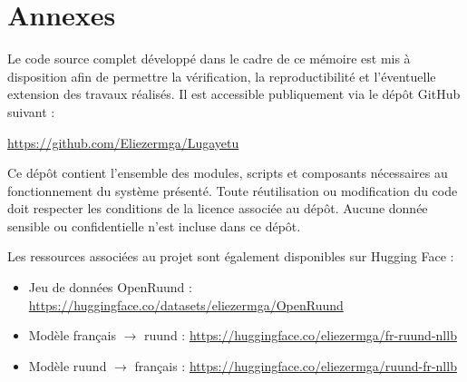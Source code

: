 \setcounter{chapter}{0}
\renewcommand{\thechapter}{\Alph{chapter}}
\chapter{Annexes}

\noindent Le code source complet développé dans le cadre de ce mémoire est mis à disposition afin de permettre la vérification, la reproductibilité et l'éventuelle extension des travaux réalisés. Il est accessible publiquement via le dépôt GitHub suivant :

\begin{center}
\url{https://github.com/Eliezermga/Lugayetu}
\end{center}

\noindent Ce dépôt contient l'ensemble des modules, scripts et composants nécessaires au fonctionnement du système présenté. Toute réutilisation ou modification du code doit respecter les conditions de la licence associée au dépôt. Aucune donnée sensible ou confidentielle n'est incluse dans ce dépôt.

\noindent Les ressources associées au projet sont également disponibles sur Hugging Face :
\begin{itemize}
    \item Jeu de données OpenRuund : \url{https://huggingface.co/datasets/eliezermga/OpenRuund}
    \item Modèle français $\rightarrow$ ruund : \url{https://huggingface.co/eliezermga/fr-ruund-nllb}
    \item Modèle ruund $\rightarrow$ français : \url{https://huggingface.co/eliezermga/ruund-fr-nllb}
\end{itemize}
\vspace{2.5cm}

